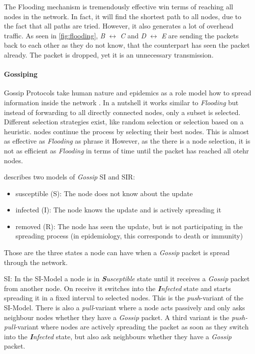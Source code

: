 The Flooding mechanism is tremendously effective win terms of reaching all nodes in the network. In fact, it will find the shortest path to all nodes, due to the fact that all paths are tried.
However, it also generates a lot of overhead traffic. As seen in \vref{fig:flooding}, \textit{B} $\leftrightarrow$ ︎\textit{C} and \textit{D} $\leftrightarrow$ \textit{E} are sending the packets back to each other as they do not know, that the counterpart has seen the packet already. The packet is dropped, yet it is an unnecessary transmission.

\paragraph{Gossiping}\label{gossiping}
\largepage
Gossip Protocols take human nature and epidemics as a role model how to spread information inside the network \cite[\S1]{Jelasity2011}. 
In a nutshell it works similar to \textit{Flooding} but instead of forwarding to all directly connected nodes, only a subset is selected. Different selection strategies exist, like random selection or selection based on a heuristic. 
 nodes continue the process by selecting their best nodes. This is almost as effective as \textit{Flooding} as \citet{riviere_voulgaris_2011} phrase it 
However, as the there is a node selection, it is not as efficient as \textit{Flooding} in terms of time until the packet has reached all otehr nodes.

\citet{Jelasity2011} describes two models of \textit{Gossip} SI and SIR:

\begin{itemize}
\item susceptible (S): The node does not know about the update
\item infected (I): The node knows the update and is actively spreading it
\item removed (R): The node has seen the update, but is not participating in the spreading process (in epidemiology, this corresponds to death or immunity)
\end{itemize}
\cite[\S1.2.2]{Jelasity2011}

Those are the three states a node can have when a \textit{Gossip} packet is spread through the network.

SI:
In the SI-Model a node is in \textit{\textbf{S}usceptible} state until it receives a \textit{Gossip} packet from another node. On receive it switches into the \textit{\textbf{I}nfected} state and starts spreading it in a fixed interval to selected nodes. This is the \textit{push}-variant of the SI-Model. There is also a \textit{pull}-variant where a node acts passively and only asks neighbour nodes whether they have a \textit{Gossip} packet. A third variant is the \textit{push-pull}-variant where nodes are actively spreading the packet as soon as they switch into the \textit{\textbf{I}nfected} state, but also ask neighbours whether they have a \textit{Gossip} packet.

